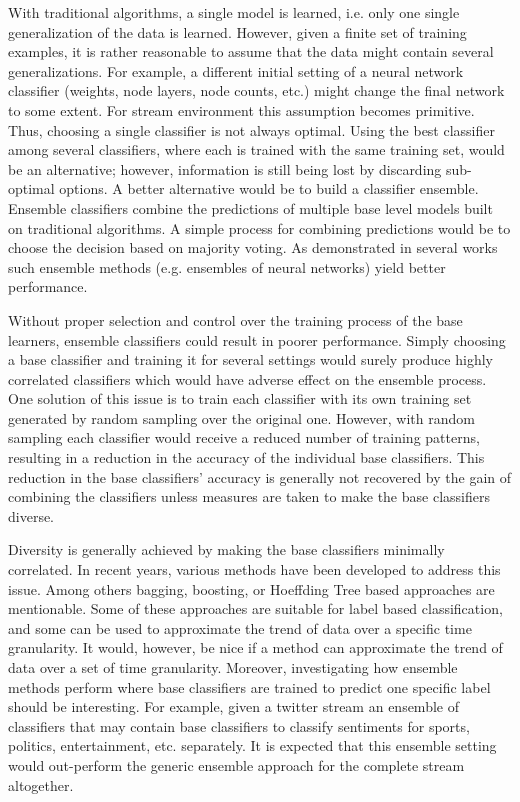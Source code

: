 With traditional algorithms, a single model is learned, i.e. only one single generalization of the data is learned. However, given a finite set of training examples, it is rather reasonable to assume that the data might contain several generalizations. For example, a different initial setting of a neural network classifier (weights, node layers, node counts, etc.) might change the final network to some extent. For stream environment this assumption becomes primitive. Thus, choosing a single classifier is not always optimal. Using the best classifier among several classifiers, where each is trained with the same training set, would be an alternative; however, information is still being lost by discarding sub-optimal options. A better alternative would be to build a classifier ensemble. Ensemble classifiers combine the predictions of multiple base level models built on traditional algorithms. A simple process for combining predictions would be to choose the decision based on majority voting. As demonstrated in several works~\cite{breiman94:bagging, schapire90:whyens} such ensemble methods (e.g. ensembles of neural networks) yield better performance.

Without proper selection and control over the training process of the base learners, ensemble classifiers could result in poorer performance. Simply choosing a base classifier and training it for several settings would surely produce highly correlated classifiers which would have adverse effect on the ensemble process. One solution of this issue is to train each classifier with its own training set generated by random sampling over the original one. However, with random sampling each classifier would receive a reduced number of training patterns, resulting in a reduction in the accuracy of the individual base classifiers. This reduction in the base classifiers' accuracy is generally not recovered by the gain of combining the classifiers unless measures are taken to make the base classifiers diverse.

Diversity is generally achieved by making the base classifiers minimally correlated. In recent years, various methods have been developed to address this issue. Among others bagging, boosting, or Hoeffding Tree based approaches are mentionable. Some of these approaches are suitable for label based classification, and some can be used to approximate the trend of data over a specific time granularity. It would, however, be nice if a method can approximate the trend of data over a set of time granularity. Moreover, investigating how ensemble methods perform where base classifiers are trained to predict one specific label should be interesting. For example, given a twitter stream an ensemble of classifiers that may contain base classifiers to classify sentiments for sports, politics, entertainment, etc. separately. It is expected that this ensemble setting would out-perform the generic ensemble approach for the complete stream altogether.

